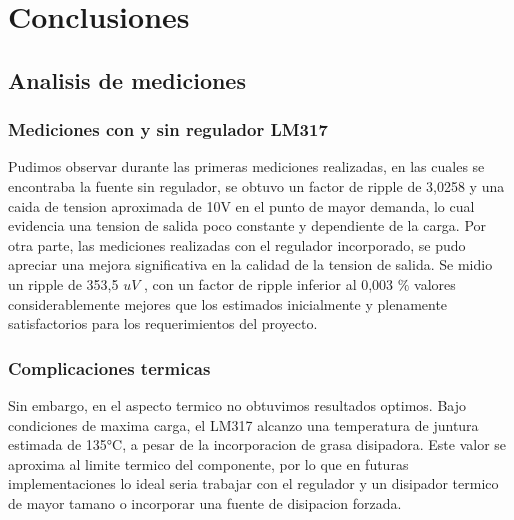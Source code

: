 \chapter{Conclusiones}

\section{Analisis de mediciones}

\subsection{Mediciones con y sin regulador LM317}

Pudimos observar durante las primeras mediciones realizadas, en las cuales se encontraba la fuente sin regulador, se obtuvo un factor de ripple de 3,0258 y una caida de tension aproximada de 10V en el punto de mayor demanda, lo cual evidencia una tension de salida poco constante y dependiente de la carga.
Por otra parte, las mediciones realizadas con el regulador incorporado, se pudo apreciar una mejora significativa en la calidad de la tension de salida. Se midio un ripple de 353,5 $u V$ , con un factor de ripple inferior al 0,003 $\percent$ valores considerablemente mejores que los estimados inicialmente y plenamente satisfactorios para los requerimientos del proyecto.

\subsection{Complicaciones termicas}

Sin embargo, en el aspecto termico no obtuvimos resultados optimos. Bajo condiciones de maxima carga, el LM317 alcanzo una temperatura de juntura estimada de 135°C, a pesar de la incorporacion de grasa disipadora. Este valor se aproxima al limite termico del componente, por lo que en futuras implementaciones lo ideal seria trabajar con el regulador y un disipador termico de mayor tamano o incorporar una fuente de disipacion forzada.
